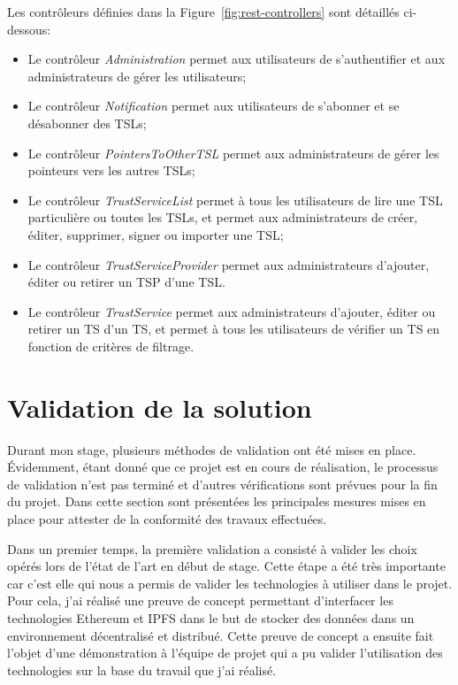 \documentclass{tnreport}
\begin{document}
Les contrôleurs définies dans la Figure~\ref{fig:rest-controllers} sont détaillés ci-dessous:
\begin{itemize}
	\item Le contrôleur \textit{Administration} permet aux utilisateurs de s'authentifier et aux administrateurs de gérer les utilisateurs;
	\item Le contrôleur \textit{Notification} permet aux utilisateurs de s'abonner et se désabonner des TSLs;
	\item Le contrôleur \textit{PointersToOtherTSL} permet aux administrateurs de gérer les pointeurs vers les autres TSLs;
	\item Le contrôleur \textit{TrustServiceList} permet à tous les utilisateurs de lire une TSL particulière ou toutes les TSLs, et permet aux administrateurs de créer, éditer, supprimer, signer ou importer une TSL;
	\item Le contrôleur \textit{TrustServiceProvider} permet aux administrateurs d'ajouter, éditer ou retirer un TSP d'une TSL.
	\item Le contrôleur \textit{TrustService} permet aux administrateurs d'ajouter, éditer ou retirer un TS d'un TS, et permet à tous les utilisateurs de vérifier un TS en fonction de critères de filtrage.
\end{itemize}

\section{Validation de la solution}

Durant mon stage, plusieurs méthodes de validation ont été mises en place. Évidemment, étant
donné que ce projet est en cours de réalisation, le processus de validation n'est pas terminé et d'autres vérifications sont prévues pour la fin du projet. Dans cette section sont présentées les principales mesures mises en place pour attester de la conformité des travaux effectuées.

Dans un premier temps, la première validation a consisté à valider les choix opérés lors de l'état de l'art en début de stage. Cette étape a été très importante car c'est elle qui nous a permis de valider les technologies à utiliser dans le projet. Pour cela, j'ai réalisé une preuve de concept permettant d'interfacer les technologies Ethereum et IPFS dans le but de stocker des données dans un environnement décentralisé et distribué. Cette preuve de concept a ensuite fait l'objet d'une démonstration à l'équipe de projet qui a pu valider l'utilisation des technologies sur la base du travail que j'ai réalisé.
\end{document}
